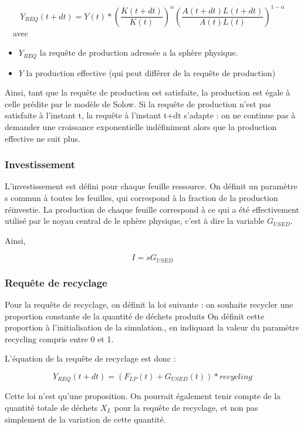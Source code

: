 \documentclass[12pt,a4paper]{article}%
\begin{document}
\[
Y_{REQ}(t+dt)=Y(t)\ast\left(  \frac{K(t+dt)}{K(t)}\right)  ^{\alpha}\left(
\frac{A(t+dt)L(t+dt)}{A(t)L(t)}\right)  ^{1-\alpha}%
\]
\ \ avec

\begin{itemize}
\item $Y_{REQ}$ la requête de production adressée a la sphère physique.

\item $Y$ la production effective (qui peut différer de la requête de production)
\end{itemize}

Ainsi, tant que la requête de production est satisfaite, la production est
égale à celle prédite par le modèle de Solow. Si la requête de
production n'est pas satisfaite à l'instant t, la requête à l'instant
t+dt s'adapte : on ne continue pas à demander une croissance exponentielle
indéfiniment alors que la production effective ne suit plus.

\subsubsection{Investissement}

L'investissement est défini pour chaque feuille ressource. On définit un
paramètre s commun à toutes les feuilles, qui correspond à la
fraction de la production réinvestie. La production de chaque feuille
correspond à ce qui a été effectivement utilisé par le noyau central de le
sphère physique, c'est à dire la variable $G_{USED}$.

Ainsi,

\qquad\qquad\qquad\qquad\qquad\qquad%
\[
I=sG_{USED}%
\]


\subsubsection{Requête de recyclage}

Pour la requête de recyclage, on définit la loi suivante : on souhaite
recycler une proportion constante de la quantité de déchets produits On
définit cette proportion à l'initialisation de la simulation., en
indiquant la valeur du paramètre recycling compris entre 0 et 1.

L'équation de la requête de recyclage est donc :%

\[
Y_{REQ}(t+dt)=(F_{LP}(t)+G_{USED}(t))\ast recycling
\]


Cette loi n'est qu'une proposition. On pourrait également tenir compte de la
quantité totale de déchets $X_{L}$ pour la requête de recyclage, et non pas
simplement de la variation de cette quantité.
\end{document}
